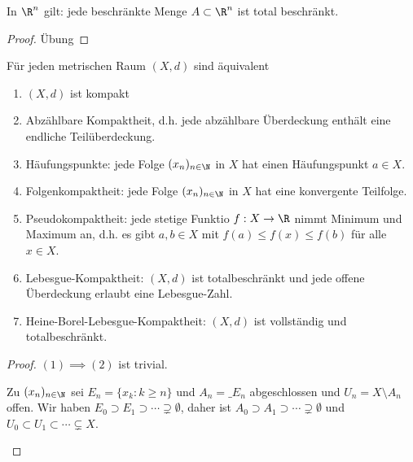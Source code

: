 \begin{prop}
	In $\R^n$ gilt: jede beschränkte Menge $A \subset \R^n$ ist total beschränkt.
	\begin{proof}
		Übung
	\end{proof}
\end{prop}

\begin{st}
	Für jeden metrischen Raum $(X,d)$ sind äquivalent
	\begin{enumerate}[(1)]
		\item
			$(X,d)$ ist kompakt
		\item
			Abzählbare Kompaktheit, d.h. jede abzählbare Überdeckung enthält eine endliche Teilüberdeckung.
		\item
			Häufungspunkte: jede Folge $(x_n)_{n\in \N}$ in $X$ hat einen Häufungspunkt $a \in X$.
		\item
			Folgenkompaktheit: jede Folge $(x_n)_{n\in \N}$ in $X$ hat eine konvergente Teilfolge.
		\item
			Pseudokompaktheit: jede stetige Funktio $f: X \to \R$ nimmt Minimum und Maximum an, d.h. es gibt $a,b \in X$ mit $f(a) \le f(x) \le f(b)$ für alle $x \in X$.
		\item
			Lebesgue-Kompaktheit: $(X,d)$ ist totalbeschränkt und jede offene Überdeckung erlaubt eine Lebesgue-Zahl.
		\item
			Heine-Borel-Lebesgue-Kompaktheit: $(X,d)$ ist vollständig und totalbeschränkt.
	\end{enumerate}
	\begin{proof}
		$(1) \implies (2)$ ist trivial.
		\begin{seg}[$(2) \implies (3)$]
			Zu $(x_n)_{n\in\N}$ sei $E_n = \{x_k : k \ge n\}$ und $A_n = \_{E_n}$ abgeschlossen und $U_n = X \setminus A_n$ offen.
			Wir haben $E_0 \supset E_1 \supset \dotsb \supsetneq \emptyset$, daher ist $A_0 \supset A_1 \supset \dotsb \supsetneq \emptyset$ und $U_0 \subset U_1 \subset \dotsb \subsetneq X$.


\end{seg}
\end{proof}
\end{st}
